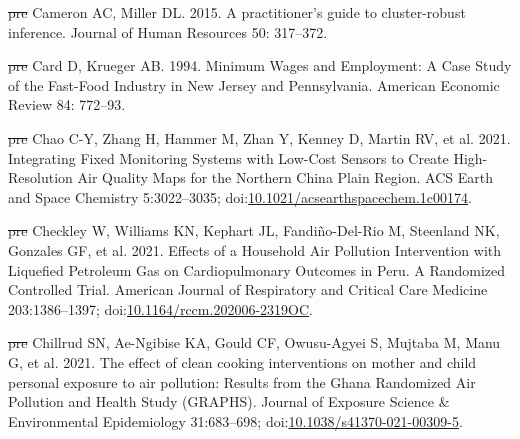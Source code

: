 \documentclass[
  letterpaper,
  DIV=11,
  numbers=noendperiod]{scrartcl}
\newlength{\cslhangindent}
\newenvironment{CSLReferences}[2] %
 {\begin{list}{}{%
  \setlength{\itemindent}{0pt} %
  \setlength{\leftmargin}{0pt} %
  \setlength{\parsep}{0pt} %
  \ifodd #1
   \setlength{\leftmargin}{\cslhangindent} %
   \setlength{\itemindent}{-1\cslhangindent} %
  \fi
  \setlength{\itemsep}{#2\baselineskip}}} %
 {\end{list}} %
\providecommand{\DIFdeltex}[1]{{\protect\color{red}\sout{#1}}}                      %
\providecommand{\DIFaddbegin}{} %
\providecommand{\DIFaddend}{} %
\providecommand{\DIFdelbegin}{} %
\providecommand{\DIFdelend}{} %
\providecommand{\DIFdel}[1]{\texorpdfstring{\DIFdeltex{#1}}{}} %
\newcommand{\DIFscaledelfig}{0.5}
\newlength{\DIFdelgraphicswidth} %
\newlength{\DIFdelgraphicsheight} %
\newcommand{\DIFaddincludegraphics}[2][]{{\color{blue}\fbox{\DIFOincludegraphics[#1]{#2}}}} %
\newcommand{\DIFdelincludegraphics}[2][]{%
\sbox{\DIFdelgraphicsbox}{\DIFOincludegraphics[#1]{#2}}%
\settoboxwidth{\DIFdelgraphicswidth}{\DIFdelgraphicsbox} %
\settoboxtotalheight{\DIFdelgraphicsheight}{\DIFdelgraphicsbox} %
\scalebox{\DIFscaledelfig}{%
\parbox[b]{\DIFdelgraphicswidth}{\usebox{\DIFdelgraphicsbox}\\[-\baselineskip] \rule{\DIFdelgraphicswidth}{0em}}\llap{\resizebox{\DIFdelgraphicswidth}{\DIFdelgraphicsheight}{%
\setlength{\unitlength}{\DIFdelgraphicswidth}%
\begin{picture}(1,1)%
\thicklines\linethickness{2pt} %
{\color[rgb]{1,0,0}\put(0,0){\framebox(1,1){}}}%
{\color[rgb]{1,0,0}\put(0,0){\line( 1,1){1}}}%
{\color[rgb]{1,0,0}\put(0,1){\line(1,-1){1}}}%
\end{picture}%
}\hspace*{3pt}}} %
} %
\DeclareRobustCommand{\DIFaddbegin}{\DIFOaddbegin \let\includegraphics\DIFaddincludegraphics} %
\DeclareRobustCommand{\DIFaddend}{\DIFOaddend \let\includegraphics\DIFOincludegraphics} %
\DeclareRobustCommand{\DIFdelbegin}{\DIFOdelbegin \let\includegraphics\DIFdelincludegraphics} %
\DeclareRobustCommand{\DIFdelend}{\DIFOaddend \let\includegraphics\DIFOincludegraphics} %
\begin{document}
\begin{CSLReferences}{1}{1}
\DIFdelbegin %
\DIFdel{pre}%
\DIFdelend \DIFaddbegin {}
\DIFaddend Cameron AC, Miller DL. 2015. A practitioner's guide to cluster-robust
inference. Journal of Human Resources 50: 317--372.

\DIFdelbegin %
\DIFdel{pre}%
\DIFdelend \DIFaddbegin {}
\DIFaddend Card D, Krueger AB. 1994. Minimum {Wages} and {Employment}: {A Case
Study} of the {Fast-Food Industry} in {New Jersey} and {Pennsylvania}.
American Economic Review 84: 772--93.

\DIFdelbegin %
\DIFdel{pre}%
\DIFdelend \DIFaddbegin {}
\DIFaddend Chao C-Y, Zhang H, Hammer M, Zhan Y, Kenney D, Martin RV, et al. 2021.
Integrating {Fixed Monitoring Systems} with {Low-Cost Sensors} to
{Create High-Resolution Air Quality Maps} for the {Northern China Plain
Region}. ACS Earth and Space Chemistry 5:3022--3035;
doi:\href{https://doi.org/10.1021/acsearthspacechem.1c00174}{10.1021/acsearthspacechem.1c00174}.

\DIFdelbegin %
\DIFdel{pre}%
\DIFdelend \DIFaddbegin {}
\DIFaddend Checkley W, Williams KN, Kephart JL, Fandiño-Del-Rio M, Steenland NK,
Gonzales GF, et al. 2021. Effects of a {Household Air Pollution
Intervention} with {Liquefied Petroleum Gas} on {Cardiopulmonary
Outcomes} in {Peru}. {A Randomized Controlled Trial}. American Journal
of Respiratory and Critical Care Medicine 203:1386--1397;
doi:\href{https://doi.org/10.1164/rccm.202006-2319OC}{10.1164/rccm.202006-2319OC}.

\DIFdelbegin %
\DIFdel{pre}%
\DIFdelend \DIFaddbegin {}
\DIFaddend Chillrud SN, Ae-Ngibise KA, Gould CF, Owusu-Agyei S, Mujtaba M, Manu G,
et al. 2021. The effect of clean cooking interventions on mother and
child personal exposure to air pollution: Results from the {Ghana
Randomized Air Pollution} and {Health Study} ({GRAPHS}). Journal of
Exposure Science \& Environmental Epidemiology 31:683--698;
doi:\href{https://doi.org/10.1038/s41370-021-00309-5}{10.1038/s41370-021-00309-5}.


\end{CSLReferences}
\end{document}
